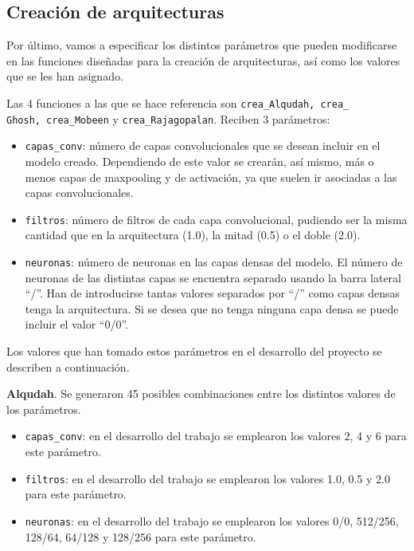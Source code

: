 \subsection{Creación de arquitecturas}

Por último, vamos a especificar los distintos parámetros que pueden modificarse en las funciones diseñadas para la creación de arquitecturas, así como los valores que se les han asignado.

Las 4 funciones a las que se hace referencia son \texttt{crea\_Alqudah, crea\_\\Ghosh, crea\_Mobeen} y \texttt{crea\_Rajagopalan}. Reciben 3 parámetros:
\begin{itemize}
    \item \texttt{capas\_conv}: número de capas convolucionales que se desean incluir en el modelo creado. Dependiendo de este valor se crearán, así mismo, más o menos capas de maxpooling y de activación, ya que suelen ir asociadas a las capas convolucionales.
    \item \texttt{filtros}: número de filtros de cada capa convolucional, pudiendo ser la misma cantidad que en la arquitectura (1.0), la mitad (0.5) o el doble (2.0).
    \item \texttt{neuronas}: número de neuronas en las capas densas del modelo. El número de neuronas de las distintas capas se encuentra separado usando la barra lateral “/”. Han de introducirse tantas valores separados por ``/'' como capas densas tenga la arquitectura. Si se desea que no tenga ninguna capa densa se puede incluir el valor ``0/0''.
\end{itemize}

Los valores que han tomado estos parámetros en el desarrollo del proyecto se describen a continuación.

\textbf{Alqudah}. Se generaron 45 posibles combinaciones entre los distintos valores de los parámetros.
\begin{itemize}
    \item \texttt{capas\_conv}: en el desarrollo del trabajo se emplearon los valores 2, 4 y 6 para este parámetro.
    \item \texttt{filtros}: en el desarrollo del trabajo se emplearon los valores 1.0, 0.5 y 2.0 para este parámetro.
    \item \texttt{neuronas}: en el desarrollo del trabajo se emplearon los valores 0/0, 512/256, 128/64, 64/128 y 128/256 para este parámetro.
\end{itemize}

